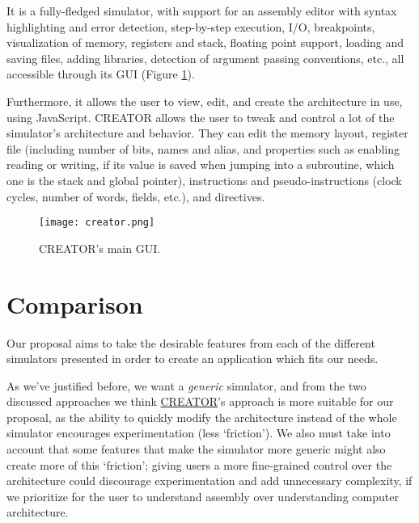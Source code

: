 It is a fully-fledged simulator, with support for an \gls{assembly} editor with syntax highlighting and error detection, step-by-step execution, \gls{I/O}, breakpoints, visualization of \gls{memory}, \glspl{register} and \gls{stack}, floating point support, loading and saving files, adding libraries, detection of argument passing conventions, etc., all accessible through its \gls{GUI} (Figure \ref{fig:creator}). 

Furthermore, it allows the user to view, edit, and create the architecture in use, using JavaScript. CREATOR allows the user to tweak and control a lot of the simulator's architecture and behavior. They can edit the \gls{memory} layout, register file (including number of bits, names and alias, and properties such as enabling reading or writing, if its value is saved when jumping into a \gls{subroutine}, which one is the stack and global pointer), \glspl{instruction} and \glspl{pseudo-instruction} (\glspl{clock cycle}, number of words, fields, etc.), and \glspl{directive}.


\begin{figure}[h]
  \caption{CREATOR's main \gls{GUI}.}
  \texttt{[image: creator.png]}
  \label{fig:creator}
\end{figure}



\section{Comparison}\label{sec:comparison}
Our proposal aims to take the desirable features from each of the different simulators presented in order to create an application which fits our needs.

As we've justified before, we want a \textit{generic} simulator, and from the two discussed approaches we think \hyperref[subsubsec:creator]{CREATOR}'s approach is more suitable for our proposal, as the ability to quickly modify the architecture instead of  the whole simulator encourages experimentation (less `friction'). We also must take into account that some features that make the simulator more generic might also create more of this `friction'; giving users a more fine-grained control over the architecture could discourage experimentation and add unnecessary complexity, if we prioritize for the user to understand \gls{assembly} over understanding computer architecture.  %


